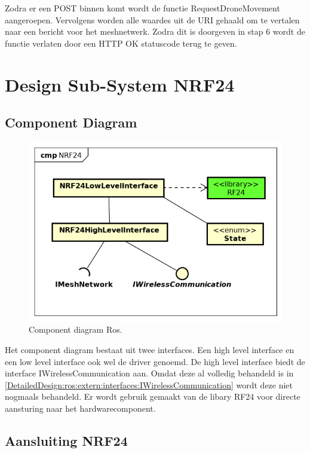 \documentclass[a4paper, 11pt, oneside]{report}
\begin{document}
Zodra er een POST binnen komt wordt de functie RequestDroneMovement aangeroepen.
Vervolgens worden alle waardes uit de URI gehaald om te vertalen naar een bericht voor het meshnetwerk.
Zodra dit is doorgeven in stap 6 wordt de functie verlaten door een HTTP OK statuscode terug te geven.






\section{Design Sub-System NRF24}
\label{DetailedDesign:NRF24}

\subsection{Component Diagram}
\label{DetailedDesign:NRF24:ComponentDiagram}
\begin{figure}[H]
	\begin{center}\includegraphics[width=.5\linewidth]{Afbeeldingen/NRF24ComponentDiagram.png}\end{center}
	\caption{Component diagram Ros.}
	\label{fig:component:NRF24}
\end{figure}

Het component diagram bestaat uit twee interfaces. Een high level interface en een low level interface ook wel de driver genoemd.
De high level interface biedt de interface IWirelessCommunication aan. Omdat deze al volledig behandeld is in \autoref{DetailedDesign:ros:extern:interfaces:IWirelessCommunication}  wordt deze niet nogmaals behandeld. Er wordt gebruik gemaakt van de libary RF24 \cite{nrf24git} voor directe aansturing naar het hardwarecomponent.

\subsection{Aansluiting NRF24}
\end{document}
